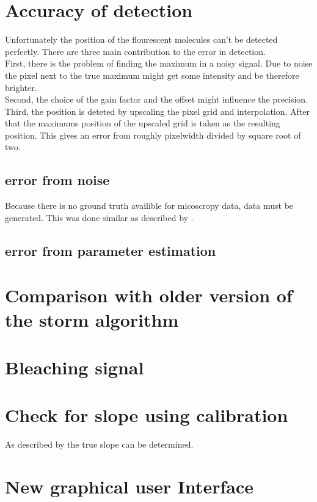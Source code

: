 \section{Accuracy of detection}
Unfortunately the position of the flourescent molecules can't be detected
perfectly. There are three main contribution to the error in detection.\\
First, there is the problem of finding the maximum in a noisy signal. Due to
noise the pixel next to the true maximum might get some intensity and be
therefore brighter.\\
Second, the choice of the gain factor and the offset might influence the
precision.\\
Third, the position is deteted by upscaling the pixel grid and interpolation.
After that the maximums position of the upscaled grid is taken as the resulting
position. This gives an error from roughly pixelwidth divided by square root of
two.
\subsection{error from noise}
Because there is no ground truth availible for micoscropy data, data must be
generated. This was done similar as described by \cite{simulated}.
\subsection{error from parameter estimation}

\section{Comparison with older version of the storm algorithm}
\section{Bleaching signal}

\section{Check for slope using calibration}
As described by \cite{meanVar} the true slope can be determined.

\section{New graphical user Interface}